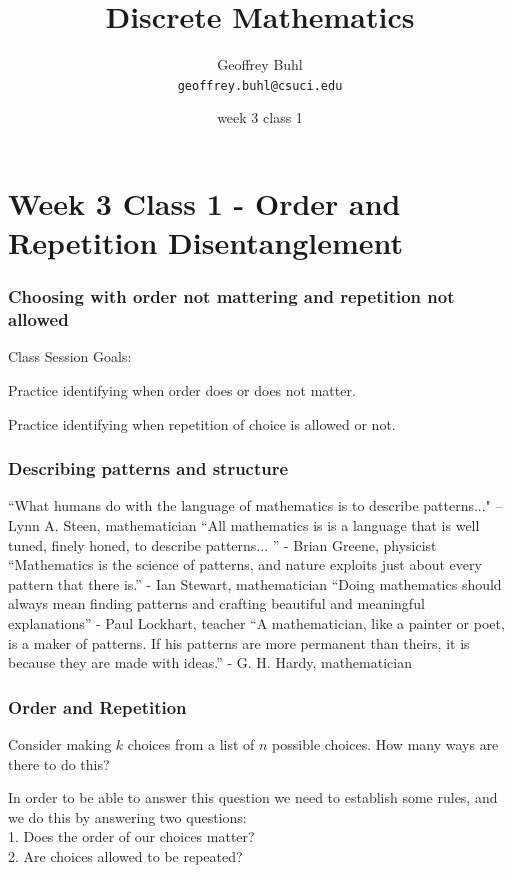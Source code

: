 \documentclass[xcolor=table]{beamer}
\title{Discrete Mathematics}
\author[Geoffrey Buhl]{Geoffrey Buhl \\ \texttt{geoffrey.buhl@csuci.edu}}
\institute[CSUCI]{California State University Channel Islands}
\date{week 3 class 1}
\newenvironment{packed_enum}{
\begin{enumerate}
  \setlength{\itemsep}{1pt}
  \setlength{\parskip}{0pt}
  \setlength{\parsep}{0pt}
}{\end{enumerate}}
\begin{document}


\section{Week 3 Class 1 - Order and Repetition Disentanglement}


\frame
{
  \frametitle{Choosing with order not mattering and repetition not allowed}

Class Session Goals:
\begin{packed_enum}
\item Practice identifying when order does or does not matter.
\item Practice identifying when repetition of choice is allowed or not.
\end{packed_enum}

}


\frame
{
  \frametitle{Describing patterns and structure}

``What humans do with the language of mathematics is to describe 
      patterns..."  --  Lynn A. Steen, mathematician
\vfill
``All mathematics is is a language that is well tuned, finely honed, to describe patterns... '' - Brian Greene, physicist
\vfill
``Mathematics is the science of patterns, and nature exploits just about every pattern that there is.'' - Ian Stewart, mathematician
\vfill
``Doing mathematics should always mean finding patterns and crafting beautiful and meaningful explanations'' - Paul Lockhart, teacher
\vfill
``A mathematician, like a painter or poet, is a maker of patterns. If his patterns are more permanent than theirs, it is because they are made with ideas.'' - G. H. Hardy, mathematician

}

\frame
{
  \frametitle{Order and Repetition}

Consider making $k$ choices from a list of $n$ possible choices.  How many ways are there to do this?
\vfill

In order to be able to answer this question we need to establish some rules, and we do this by answering two questions:\\
\vspace{.25cm}
1. Does the order of our choices matter?\\
\vspace{.25cm}
2. Are choices allowed to be repeated?
\vfill

}
\end{document}
